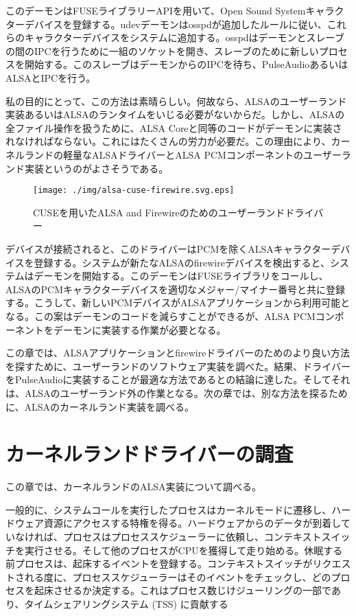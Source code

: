 \documentclass[onecolumn]{jarticle}
\begin{document}
このデーモンはFUSEライブラリーAPIを用いて、Open Sound Systemキャラクターデバイスを登録する。udevデーモンはosspdが追加したルールに従い、これらのキャラクターデバイスをシステムに追加する。osspdはデーモンとスレーブの間のIPCを行うために一組のソケットを開き、スレーブのために新しいプロセスを開始する。このスレーブはデーモンからのIPCを待ち、PulseAudioあるいはALSAとIPCを行う。

私の目的にとって、この方法は素晴らしい。何故なら、ALSAのユーザーランド実装あるいはALSAのランタイムをいじる必要がないからだ。しかし、ALSAの全ファイル操作を扱うために、ALSA Coreと同等のコードがデーモンに実装されなければならない。これにはたくさんの労力が必要だ。この理由により、カーネルランドの軽量なALSAドライバーとALSA PCMコンポーネントのユーザーランド実装というのがよさそうである。


\begin{figure}[H]
	\centering
	\texttt{[image: ./img/alsa-cuse-firewire.svg.eps]}
	\caption{{CUSEを用いたALSA and Firewireのためのユーザーランドドライバー}}
	\label{alsa_cuse_firewire}
\end{figure}

デバイスが接続されると、このドライバーはPCMを除くALSAキャラクターデバイスを登録する。システムが新たなALSAのfirewireデバイスを検出すると、システムはデーモンを開始する。このデーモンはFUSEライブラリをコールし、ALSAのPCMキャラクターデバイスを適切なメジャー/マイナー番号と共に登録する。こうして、新しいPCMデバイスがALSAアプリケーションから利用可能となる。この案はデーモンのコードを減らすことができるが、ALSA PCMコンポーネントをデーモンに実装する作業が必要となる。

この章では、ALSAアプリケーションとfirewireドライバーのためのより良い方法を探すために、ユーザーランドのソフトウェア実装を調べた。結果、ドライバーをPulseAudioに実装することが最適な方法であるとの結論に達した。そしてそれは、ALSAのユーザーランド外の作業となる。次の章では、別な方法を探るために、ALSAのカーネルランド実装を調べる。

\section{カーネルランドドライバーの調査}

この章では、カーネルランドのALSA実装について調べる。

一般的に、システムコールを実行したプロセスはカーネルモードに遷移し、ハードウェア資源にアクセスする特権を得る。ハードウェアからのデータが到着していなければ、プロセスはプロセススケジューラーに依頼し、コンテキストスイッチを実行させる。そして他のプロセスがCPUを獲得して走り始める。休眠する前プロセスは、起床するイベントを登録する。コンテキストスイッチがリクエストされる度に、プロセススケジューラーはそのイベントをチェックし、どのプロセスを起床させるか決定する。これはプロセス数じけジューリングの一部であり、タイムシェアリングシステム (TSS) に貢献する
\end{document}
